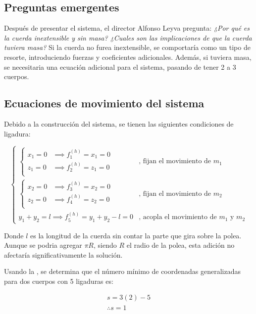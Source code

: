 \documentclass{article}
\theoremstyle{definition}
\begin{document}
\subsection{Preguntas emergentes}
Después de presentar el sistema, el director Alfonso Leyva pregunta: \emph{¿Por qué es la cuerda inextensible y sin masa? ¿Cuales son las implicaciones de que la cuerda tuviera masa?} Si la cuerda no furea inextensible, se comportaría como un tipo de resorte, introduciendo fuerzas y coeficientes adicionales. Además, si tuviera masa, se necesitaria una ecuación adicional para el sistema, pasando de tener 2 a 3 cuerpos.

\subsection{Ecuaciones de movimiento del sistema}
Debido a la construcción del sistema, se tienen las siguientes condiciones de ligadura:

\begin{equation}
	\begin{cases}
		\begin{cases}
			x_1 = 0 &\implies f_1^{(h)} = x_1 = 0 \\
			z_1 = 0 &\implies f_2^{(h)} = z_1 = 0 \\
		\end{cases} & \text{, fijan el movimiento de } m_1 \\
		\begin{cases}
			x_2 = 0 &\implies f_3^{(h)} = x_2 = 0 \\
			z_2 = 0 &\implies f_4^{(h)} = z_2 = 0 \\
		\end{cases} & \text{, fijan el movimiento de } m_2 \\
		y_1 + y_2 = l  \implies f_5^{(h)} = y_1 + y_2 - l = 0  & \text{, acopla el movimiento de $m_1$ y $m_2$}
	\end{cases}
\end{equation}

Donde $l$ es la longitud de la cuerda sin contar la parte que gira sobre la polea. Aunque se podria agregar $\pi R$, siendo $R$ el radio de la polea, esta adición no afectaría significativamente la solución.

Usando la , se determina que el número mínimo de coordenadas generalizadas para dos cuerpos con 5 ligaduras es:

\begin{gather}
	s = 3(2) - 5 \\
	\therefore s = 1
\end{gather}
\end{document}

